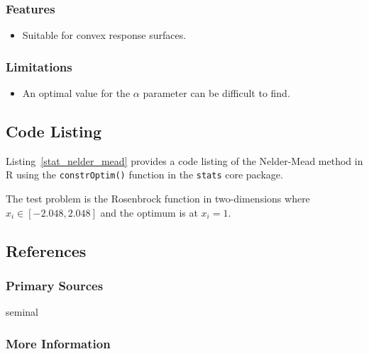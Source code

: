 \subsubsection{Features}

\begin{itemize}
	\item Suitable for convex response surfaces.
\end{itemize}

\subsubsection{Limitations}

\begin{itemize}
	\item An optimal value for the $\alpha$ parameter can be difficult to find.
\end{itemize}


\subsection{Code Listing}
Listing~\ref{stat_nelder_mead} provides a code listing of the Nelder-Mead method in R using the \texttt{constrOptim()} function in the \texttt{stats} core package. 

The test problem is the Rosenbrock function in two-dimensions where $x_i\in[-2.048,2.048]$ and the optimum is at $x_i=1$.



\subsection{References}

\subsubsection{Primary Sources}

seminal \cite{Nelder1965}

\subsubsection{More Information}





